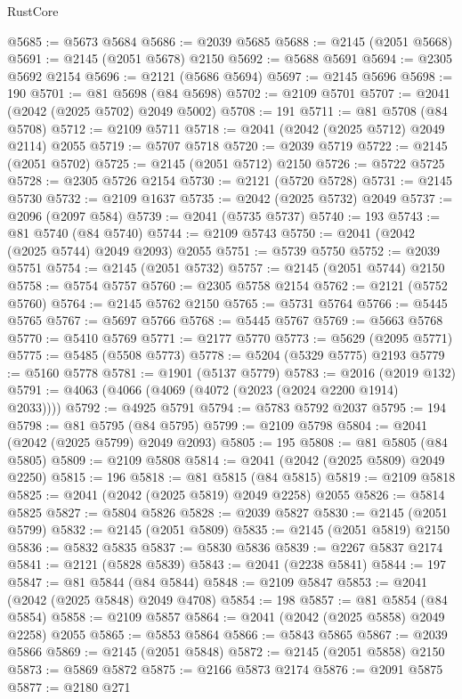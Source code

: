 \begin{lexlean}{RustCore}
\begin{coremodule}
@5685 := @5673 @5684
@5686 := @2039 @5685
@5688 := @2145 (@2051 @5668)
@5691 := @2145 (@2051 @5678) @2150
@5692 := @5688 @5691
@5694 := @2305 @5692 @2154
@5696 := @2121 (@5686 @5694)
@5697 := @2145 @5696
@5698 := 190
@5701 := @81 @5698 (@84 @5698)
@5702 := @2109 @5701
@5707 := @2041 (@2042 (@2025 @5702) @2049 @5002)
@5708 := 191
@5711 := @81 @5708 (@84 @5708)
@5712 := @2109 @5711
@5718 := @2041 (@2042 (@2025 @5712) @2049 @2114) @2055
@5719 := @5707 @5718
@5720 := @2039 @5719
@5722 := @2145 (@2051 @5702)
@5725 := @2145 (@2051 @5712) @2150
@5726 := @5722 @5725
@5728 := @2305 @5726 @2154
@5730 := @2121 (@5720 @5728)
@5731 := @2145 @5730
@5732 := @2109 @1637
@5735 := @2042 (@2025 @5732) @2049
@5737 := @2096 (@2097 @584)
@5739 := @2041 (@5735 @5737)
@5740 := 193
@5743 := @81 @5740 (@84 @5740)
@5744 := @2109 @5743
@5750 := @2041 (@2042 (@2025 @5744) @2049 @2093) @2055
@5751 := @5739 @5750
@5752 := @2039 @5751
@5754 := @2145 (@2051 @5732)
@5757 := @2145 (@2051 @5744) @2150
@5758 := @5754 @5757
@5760 := @2305 @5758 @2154
@5762 := @2121 (@5752 @5760)
@5764 := @2145 @5762 @2150
@5765 := @5731 @5764
@5766 := @5445 @5765
@5767 := @5697 @5766
@5768 := @5445 @5767
@5769 := @5663 @5768
@5770 := @5410 @5769
@5771 := @2177 @5770
@5773 := @5629 (@2095 @5771)
@5775 := @5485 (@5508 @5773)
@5778 := @5204 (@5329 @5775) @2193
@5779 := @5160 @5778
@5781 := @1901 (@5137 @5779)
@5783 := @2016 (@2019 @132)
@5791 := @4063 (@4066 (@4069 (@4072 (@2023 (@2024 @2200 @1914) @2033))))
@5792 := @4925 @5791
@5794 := @5783 @5792 @2037
@5795 := 194
@5798 := @81 @5795 (@84 @5795)
@5799 := @2109 @5798
@5804 := @2041 (@2042 (@2025 @5799) @2049 @2093)
@5805 := 195
@5808 := @81 @5805 (@84 @5805)
@5809 := @2109 @5808
@5814 := @2041 (@2042 (@2025 @5809) @2049 @2250)
@5815 := 196
@5818 := @81 @5815 (@84 @5815)
@5819 := @2109 @5818
@5825 := @2041 (@2042 (@2025 @5819) @2049 @2258) @2055
@5826 := @5814 @5825
@5827 := @5804 @5826
@5828 := @2039 @5827
@5830 := @2145 (@2051 @5799)
@5832 := @2145 (@2051 @5809)
@5835 := @2145 (@2051 @5819) @2150
@5836 := @5832 @5835
@5837 := @5830 @5836
@5839 := @2267 @5837 @2174
@5841 := @2121 (@5828 @5839)
@5843 := @2041 (@2238 @5841)
@5844 := 197
@5847 := @81 @5844 (@84 @5844)
@5848 := @2109 @5847
@5853 := @2041 (@2042 (@2025 @5848) @2049 @4708)
@5854 := 198
@5857 := @81 @5854 (@84 @5854)
@5858 := @2109 @5857
@5864 := @2041 (@2042 (@2025 @5858) @2049 @2258) @2055
@5865 := @5853 @5864
@5866 := @5843 @5865
@5867 := @2039 @5866
@5869 := @2145 (@2051 @5848)
@5872 := @2145 (@2051 @5858) @2150
@5873 := @5869 @5872
@5875 := @2166 @5873 @2174
@5876 := @2091 @5875
@5877 := @2180 @271

\end{coremodule}
\end{lexlean}

